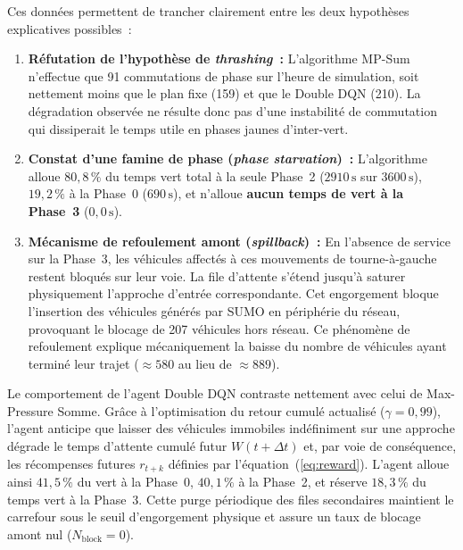 \documentclass[10pt,twocolumn,letterpaper]{article}
\begin{document}
Ces données permettent de trancher clairement entre les deux hypothèses explicatives possibles~:
\begin{enumerate}
    \item \textbf{Réfutation de l'hypothèse de \emph{thrashing}~:} L'algorithme MP-Sum n'effectue que 91 commutations de phase sur l'heure de simulation, soit nettement moins que le plan fixe (159) et que le Double DQN (210). La dégradation observée ne résulte donc pas d'une instabilité de commutation qui dissiperait le temps utile en phases jaunes d'inter-vert.
    \item \textbf{Constat d'une famine de phase (\emph{phase starvation})~:} L'algorithme alloue $80{,}8\,\%$ du temps vert total à la seule Phase~2 ($2910\,\mathrm{s}$ sur $3600\,\mathrm{s}$), $19{,}2\,\%$ à la Phase~0 ($690\,\mathrm{s}$), et n'alloue \textbf{aucun temps de vert à la Phase~3} ($0{,}0\,\mathrm{s}$).
    \item \textbf{Mécanisme de refoulement amont (\emph{spillback})~:} En l'absence de service sur la Phase~3, les véhicules affectés à ces mouvements de tourne-à-gauche restent bloqués sur leur voie. La file d'attente s'étend jusqu'à saturer physiquement l'approche d'entrée correspondante. Cet engorgement bloque l'insertion des véhicules générés par SUMO en périphérie du réseau, provoquant le blocage de 207 véhicules hors réseau. Ce phénomène de refoulement explique mécaniquement la baisse du nombre de véhicules ayant terminé leur trajet ($\approx 580$ au lieu de $\approx 889$).
\end{enumerate}

Le comportement de l'agent Double DQN contraste nettement avec celui de Max-Pressure Somme. Grâce à l'optimisation du retour cumulé actualisé ($\gamma = 0{,}99$), l'agent anticipe que laisser des véhicules immobiles indéfiniment sur une approche dégrade le temps d'attente cumulé futur $W(t + \Delta t)$ et, par voie de conséquence, les récompenses futures $r_{t+k}$ définies par l'équation~(\ref{eq:reward}). L'agent alloue ainsi $41{,}5\,\%$ du vert à la Phase~0, $40{,}1\,\%$ à la Phase~2, et réserve $18{,}3\,\%$ du temps vert à la Phase~3. Cette purge périodique des files secondaires maintient le carrefour sous le seuil d'engorgement physique et assure un taux de blocage amont nul ($N_{\text{block}} = 0$).
\end{document}
